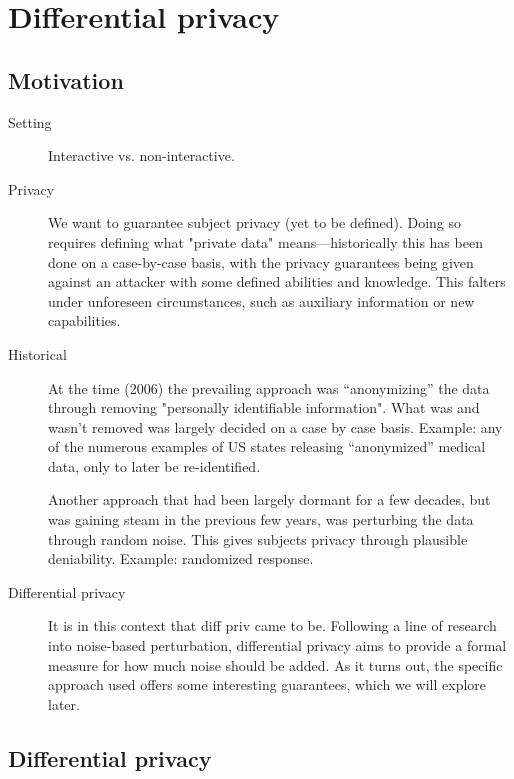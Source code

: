 \documentclass[12pt]{article}
\begin{document}
\section{Differential privacy}

\subsection{Motivation}

\begin{description}
    \item[Setting] Interactive vs. non-interactive.

    \item[Privacy] We want to guarantee subject privacy (yet to be defined). Doing so requires defining what "private data" means---historically this has been done on a case-by-case basis, with the privacy guarantees being given against an attacker with some defined abilities and knowledge. This falters under unforeseen circumstances, such as auxiliary information or new capabilities.
    
    \item[Historical] At the time (2006) the prevailing approach was ``anonymizing'' the data through removing "personally identifiable information". What was and wasn't removed was largely decided on a case by case basis. Example: any of the numerous examples of US states releasing ``anonymized'' medical data, only to later be re-identified.
    
    Another approach that had been largely dormant for a few decades, but was gaining steam in the previous few years, was perturbing the data through random noise. This gives subjects privacy through plausible deniability. Example: randomized response.
    
    \item[Differential privacy] It is in this context that diff priv came to be. Following a line of research into noise-based perturbation, differential privacy aims to provide a formal measure for how much noise should be added. As it turns out, the specific approach used offers some interesting guarantees, which we will explore later.
\end{description}

\subsection{Differential privacy \label{sec:promise}} 
\end{document}

